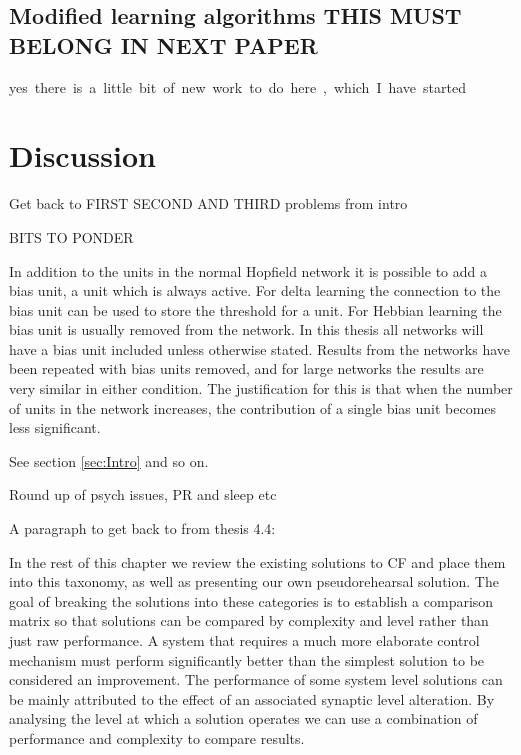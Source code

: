\subsection{Modified learning algorithms THIS MUST BELONG IN NEXT PAPER}  %
\si{yes there is a little bit of new work to do here, which I have started}


\newpage{}%
\section{Discussion}
\label{sec:Discuss}

Get back to FIRST SECOND AND THIRD problems from intro

BITS TO PONDER

In addition to the units in the normal Hopfield network it is possible to add a bias unit, a unit which is always active.  For delta learning the connection to the bias unit can be used to store the threshold for a unit.  For Hebbian learning the bias unit is usually removed from the network.  In this thesis all networks will have a bias unit included unless otherwise stated.  Results from the networks have been repeated with bias units removed, and for large networks the results are very similar in either condition.  The justification for this is that when the number of units in the network increases, the contribution of a single bias unit becomes less significant.

See section \ref{sec:Intro} and so on.

Round up of psych issues, PR and sleep etc

A paragraph to get back to from thesis 4.4:

In the rest of this chapter we review the existing solutions to CF and place them into this taxonomy, as well as presenting our own pseudorehearsal solution.  The goal of breaking the solutions into these categories is to establish a comparison matrix so that solutions can be compared by complexity and level rather than just raw performance.  A system that requires a much more elaborate control mechanism must perform significantly better than the simplest solution to be considered an improvement.  The performance of some system level solutions can be mainly attributed to the effect of an associated synaptic level alteration.  By analysing the level at which a solution operates we can use a combination of performance and complexity to compare results.

\newpage{}



